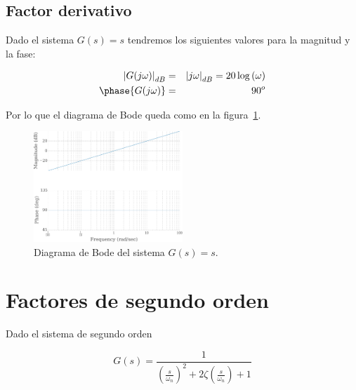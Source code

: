 
        \subsection{Factor derivativo}

            Dado el sistema $G(s) = s$ tendremos los siguientes valores para la magnitud y la fase:

            \begin{eqnarray*}
                \left| G(j \omega) \right|_{dB} & = & \left| j \omega \right|_{dB} = 20 \log{(\omega)} \\
                \phase{G(j \omega)} & = & 90^o
            \end{eqnarray*}

            Por lo que el diagrama de Bode queda como en la figura~\ref{fig:bodederivativo}.

            \begin{figure}
                \centering
                \includegraphics[width=0.5\textwidth]{./imagenes/bodederivativo.pdf}
                \caption{\label{fig:bodederivativo}Diagrama de Bode del sistema $G(s) = s$.}
            \end{figure}


    \newpage
    \section{Factores de segundo orden}

        Dado el sistema de segundo orden

        \begin{equation*}
            G(s) = \frac{1}{\left( \frac{s}{\omega_n} \right)^2 + 2 \zeta \left( \frac{s}{\omega_n} \right) + 1}
        \end{equation*}

